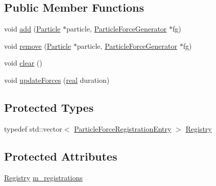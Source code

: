 \subsection*{Public Member Functions}
\begin{DoxyCompactItemize}
\item 
void \mbox{\hyperlink{classrum_1_1_particle_force_registry_a9297d30559870d6a33a459430d2ac757}{add}} (\mbox{\hyperlink{classrum_1_1_particle}{Particle}} $\ast$particle, \mbox{\hyperlink{classrum_1_1_particle_force_generator}{Particle\+Force\+Generator}} $\ast$fg)
\item 
void \mbox{\hyperlink{classrum_1_1_particle_force_registry_a326fe2b591d058a3feea1effa5ac3a70}{remove}} (\mbox{\hyperlink{classrum_1_1_particle}{Particle}} $\ast$particle, \mbox{\hyperlink{classrum_1_1_particle_force_generator}{Particle\+Force\+Generator}} $\ast$fg)
\item 
void \mbox{\hyperlink{classrum_1_1_particle_force_registry_a856ccf8959632accfbec1abf67813b71}{clear}} ()
\item 
void \mbox{\hyperlink{classrum_1_1_particle_force_registry_a0c7ba8f4e4572243079e4e9758080aa0}{update\+Forces}} (\mbox{\hyperlink{namespacerum_a7e8cca23573d5eaead0f138cbaa4862c}{real}} duration)
\end{DoxyCompactItemize}
\subsection*{Protected Types}
\begin{DoxyCompactItemize}
\item 
typedef std\+::vector$<$ \mbox{\hyperlink{structrum_1_1_particle_force_registry_1_1_particle_force_registration_entry}{Particle\+Force\+Registration\+Entry}} $>$ \mbox{\hyperlink{classrum_1_1_particle_force_registry_a63b7b5a4c79dafe5b3658505c7ac1163}{Registry}}
\end{DoxyCompactItemize}
\subsection*{Protected Attributes}
\begin{DoxyCompactItemize}
\item 
\mbox{\hyperlink{classrum_1_1_particle_force_registry_a63b7b5a4c79dafe5b3658505c7ac1163}{Registry}} \mbox{\hyperlink{classrum_1_1_particle_force_registry_a650e1205958b828c0d501b812b35212a}{m\+\_\+registrations}}
\end{DoxyCompactItemize}


